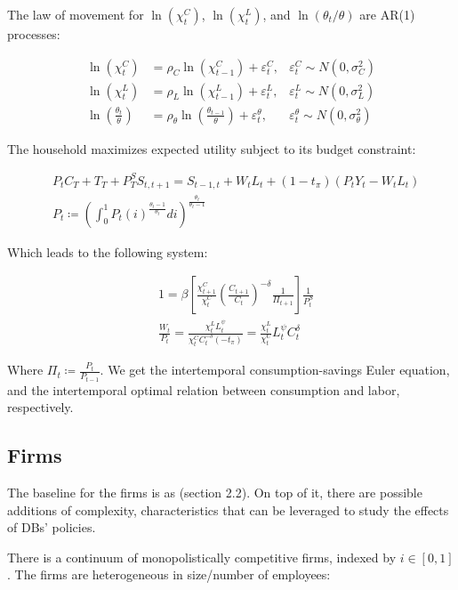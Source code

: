 \documentclass[12pt]{article}
\begin{document}
The law of movement for $\ln(\chi_t^C)$, $\ln(\chi_t^L)$, and $\ln(\theta_t/\theta)$ are AR(1) processes:

\begin{align*}
    \ln(\chi_{t}^{C}) &=\rho_{C}\ln(\chi_{t-1}^{C})+\varepsilon_{t}^{C}, &\varepsilon_{t}^{C} \sim N(0, \sigma^2_C)\\
    \ln(\chi_{t}^{L}) &=\rho_{L}\ln(\chi_{t-1}^{L})+\varepsilon_{t}^{L}, &\varepsilon_{t}^{L} \sim N(0, \sigma^2_L)\\
    \ln\left(\frac{\theta_t}{\theta}\right) &= \rho_\theta \ln\left(\frac{\theta_{t-1}}{\theta}\right) + \varepsilon^\theta_t, &\varepsilon_{t}^{\theta} \sim N(0, \sigma^2_\theta)
\end{align*}

The household maximizes expected utility subject to its budget constraint:

\begin{align*}
    &P_tC_T + T_T + P^S_TS_{t,t+1} = S_{t-1,t} + W_tL_t + (1-t_\pi)(P_tY_t - W_tL_t)\\
    &P_t \coloneqq \left(\int_0^1P_t(i)^{\frac{\theta_t - 1}{\theta_t}} di\right)^{\frac{\theta_t}{\theta_t - 1}}
\end{align*}

Which leads to the following system:

\begin{align*}
    & 1 = \beta\left[\frac{\chi_{t+1}^C}{\chi_t^C} \left(\frac{C_{t+1}}{C_t}\right)^{-\delta}\frac{1}{\Pi_{t+1}}\right]\frac{1}{P_t^S}\\
    &\frac{W_t}{P_t} = \frac{\chi_t^L L_t^{\psi}}{\chi_t^C C_t^{-\delta}(-t_\pi)} = \frac{\chi_t^L }{\chi_t^C}L_t^{\psi}C_t^{\delta}
\end{align*}

Where $\Pi_t \coloneqq \frac{P_t}{P_{t-1}}$. We get the intertemporal consumption-savings Euler equation, and the intertemporal optimal relation between consumption and labor, respectively.


\subsection{Firms}

The baseline for the firms is as \cite{ellison_2014} (section 2.2). On top of it, there are possible additions of complexity, characteristics that can be leveraged to study the effects of DBs' policies.

There is a continuum of monopolistically competitive firms, indexed by $i \in [0,1]$. The firms are heterogeneous in size/number of employees:
\end{document}
